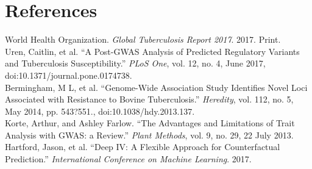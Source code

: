 \documentclass[11pt, oneside]{article}   	%
\begin{document}
\pagebreak

\section{References}

\noindent [1] World Health Organization. \emph{Global Tuberculosis Report 2017}. 2017. Print.\\

\noindent [2] Uren, Caitlin, et al. ``A Post-GWAS Analysis of Predicted Regulatory Variants and Tuberculosis Susceptibility.'' \emph{PLoS One}, vol. 12, no. 4, June 2017, doi:10.1371/journal.pone.0174738.\\

\noindent [3] Bermingham, M L, et al. ``Genome-Wide Association Study Identifies Novel Loci Associated with Resistance to Bovine Tuberculosis.'' \emph{Heredity}, vol. 112, no. 5, May 2014, pp. 543?551., doi:10.1038/hdy.2013.137.\\

\noindent [4] Korte, Arthur, and Ashley Farlow. ``The Advantages and Limitations of Trait Analysis with GWAS: a Review.'' \emph{Plant Methods}, vol. 9, no. 29, 22 July 2013.\\

\noindent [5] Hartford, Jason, et al. ``Deep IV: A Flexible Approach for Counterfactual Prediction.'' \emph{International Conference on Machine Learning}. 2017.
\end{document}
